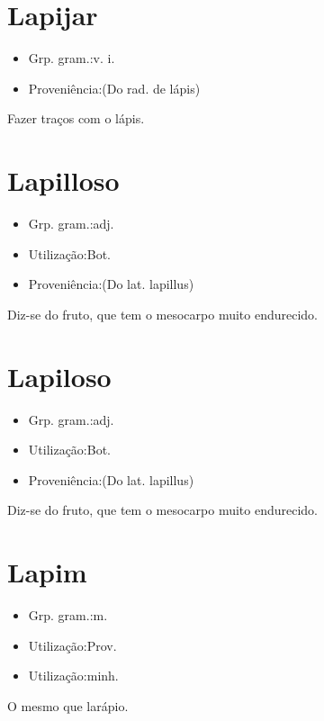 \section{Lapijar}
\begin{itemize}
\item {Grp. gram.:v. i.}
\end{itemize}
\begin{itemize}
\item {Proveniência:(Do rad. de \textunderscore lápis\textunderscore )}
\end{itemize}
Fazer traços com o lápis.
\section{Lapilloso}
\begin{itemize}
\item {Grp. gram.:adj.}
\end{itemize}
\begin{itemize}
\item {Utilização:Bot.}
\end{itemize}
\begin{itemize}
\item {Proveniência:(Do lat. \textunderscore lapillus\textunderscore )}
\end{itemize}
Diz-se do fruto, que tem o mesocarpo muito endurecido.
\section{Lapiloso}
\begin{itemize}
\item {Grp. gram.:adj.}
\end{itemize}
\begin{itemize}
\item {Utilização:Bot.}
\end{itemize}
\begin{itemize}
\item {Proveniência:(Do lat. \textunderscore lapillus\textunderscore )}
\end{itemize}
Diz-se do fruto, que tem o mesocarpo muito endurecido.
\section{Lapim}
\begin{itemize}
\item {Grp. gram.:m.}
\end{itemize}
\begin{itemize}
\item {Utilização:Prov.}
\end{itemize}
\begin{itemize}
\item {Utilização:minh.}
\end{itemize}
O mesmo que \textunderscore larápio\textunderscore .
